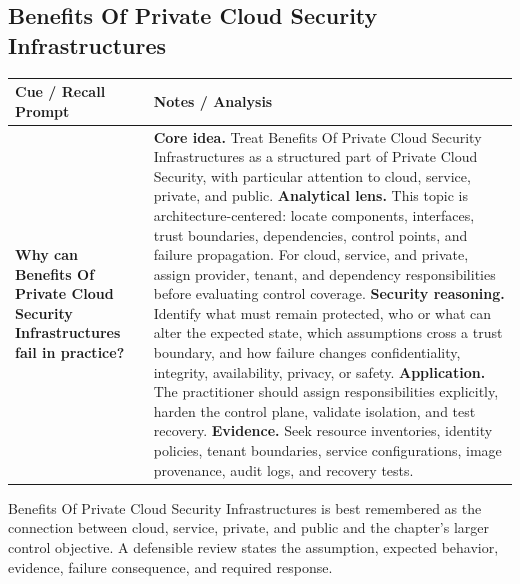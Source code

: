 \documentclass[11pt]{article}
\newcommand{\CornellHeader}{%
\rowcolor{Navy}\color{white}\bfseries Cue / Recall Prompt & \color{white}\bfseries Notes / Analysis\\\hline}
\newcommand{\CornellRow}[2]{%
\cellcolor{CueGray}\RaggedRight\textbf{#1} & \RaggedRight #2\\\hline}
\begin{document}
\subsection*{Benefits Of Private Cloud Security Infrastructures}
\begin{longtable}{>{\RaggedRight\arraybackslash}p{}|>{\RaggedRight\arraybackslash}p{}}
\CornellHeader
\CornellRow{Why can Benefits Of Private Cloud Security Infrastructures fail in practice?}{\textbf{Core idea.} Treat Benefits Of Private Cloud Security Infrastructures as a structured part of Private Cloud Security, with particular attention to cloud, service, private, and public. \textbf{Analytical lens.} This topic is architecture-centered: locate components, interfaces, trust boundaries, dependencies, control points, and failure propagation. For cloud, service, and private, assign provider, tenant, and dependency responsibilities before evaluating control coverage. \textbf{Security reasoning.} Identify what must remain protected, who or what can alter the expected state, which assumptions cross a trust boundary, and how failure changes confidentiality, integrity, availability, privacy, or safety. \textbf{Application.} The practitioner should assign responsibilities explicitly, harden the control plane, validate isolation, and test recovery. \textbf{Evidence.} Seek resource inventories, identity policies, tenant boundaries, service configurations, image provenance, audit logs, and recovery tests.}
\end{longtable}
\begin{topicsummary}
Benefits Of Private Cloud Security Infrastructures is best remembered as the connection between cloud, service, private, and public and the chapter's larger control objective. A defensible review states the assumption, expected behavior, evidence, failure consequence, and required response.
\end{topicsummary}
\end{document}
